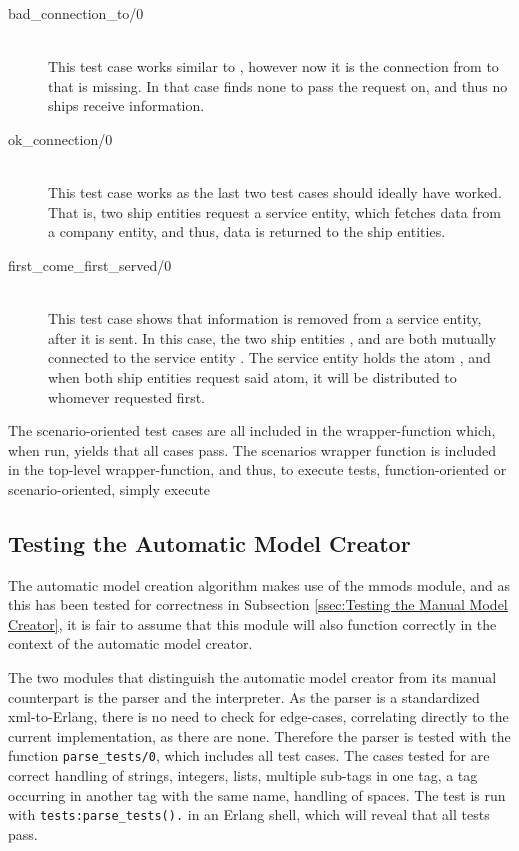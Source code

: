 \begin{description}
  \item[{bad\_connection\_to/0}]\ \\
    This test case works similar to , however now it is the connection from  to  that is missing. In that case  finds none to pass the request on, and thus no ships receive information.
  \item[{ok\_connection/0}]\ \\
    This test case works as the last two test cases should ideally have worked. That is, two ship entities request a service entity, which fetches data from a company entity, and thus, data is returned to the ship entities.
  \item[{first\_come\_first\_served/0}]\ \\
    This test case shows that information is removed from a service entity, after it is sent. In this case, the two ship entities , and  are both mutually connected to the service entity . The service entity holds the atom , and when both ship entities request said atom, it will be distributed to whomever requested first. 
\end{description}

The scenario-oriented test cases are all included in the wrapper-function  which, when run, yields that all cases pass. The scenarios wrapper function is included in the top-level wrapper-function, and thus, to execute  tests, function-oriented or scenario-oriented, simply execute 

\subsection{Testing the Automatic Model Creator}

The automatic model creation algorithm makes use of the mmods module, and as this has been tested for correctness in Subsection \ref{ssec:Testing the Manual Model Creator}, it is fair to assume that this module will also function correctly in the context of the automatic model creator. 

The two modules that distinguish the automatic model creator from its manual counterpart is the parser and the interpreter. As the parser is a standardized xml-to-Erlang, there is no need to check for edge-cases, correlating directly to the current implementation, as there are none. Therefore the parser is tested with the function \lstinline{parse_tests/0}, which includes all test cases. The cases tested for are correct handling of strings, integers, lists, multiple sub-tags in one tag, a tag occurring in another tag with the same name, handling of spaces. The test is run with \lstinline{tests:parse_tests().} in an Erlang shell, which will reveal that all tests pass.


